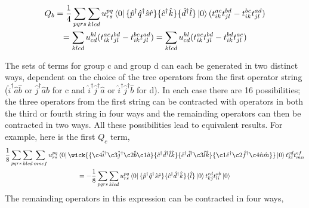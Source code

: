 \begin{equation}
    \begin{gathered}
        Q_b = \frac{1}{4}\sum_{pqrs} \sum_{klcd}
        u^{pq}_{rs} \bra{0}
            \{\hat{p}^\dagger \hat{q}^\dagger \hat{s} \hat{r} \}
            \{\hat{c}^\dagger \hat{k} \}
            \{\hat{d}^\dagger \hat{l} \}
            \ket{0}
            (t^{ac}_{ik}t^{bd}_{jl} - t^{bc}_{ik}t^{ad}_{jl}) \\
        = \sum_{klcd} u^{kl}_{cd}
            (t^{ac}_{ik}t^{bd}_{jl} - t^{bc}_{ik}t^{ad}_{jl})
        = \sum_{klcd} u^{kl}_{cd}
            (t^{ac}_{ik}t^{bd}_{jl} - t^{bd}_{ik}t^{ac}_{jl})
    \end{gathered}
\end{equation}

The sets of terms for group c and group d can each be generated in two distinct
ways, dependent on the choice of the tree operators from the first operator
string ($\hat{i}^\dagger \hat{a} \hat{b}$ or 
$\hat{j}^\dagger \hat{a} \hat{b}$ for c and 
$\hat{i}^\dagger \hat{j}^\dagger \hat{a}$ or 
$\hat{i}^\dagger \hat{j}^\dagger \hat{b}$ for d). In each case there 
are 16 possibilities; the three operators from the first string can be 
contracted with operators in both the third or fourth string in four ways and
the remainding operators can then be contracted in two ways. All these
possibilities lead to equivalent results. For example, here is the first 
$Q_c$ term,
\begin{equation}
    \begin{gathered}
    \frac{1}{8} \sum_{pqrs} \sum_{klcd} \sum_{mnef}
    u^{pq}_{rs} \bra{0}
        \wick{
        \{\c4{\hat{i}}^\dagger \c3{\hat{j}}^\dagger \c2{\hat{b}} \c1{\hat{a}} \}
        \{\hat{c}^\dagger \hat{d}^\dagger \hat{l} \hat{k} \} 
        \{\hat{c}^\dagger \hat{d}^\dagger \c3{\hat{l}} \hat{k} \}
        \{\c1{\hat{e}}^\dagger \c2{\hat{f}}^\dagger \c4{\hat{n}} \hat{m} \}
        }
    \ket{0} t^{cd}_{kl} t^{ef}_{mn} \\
    = - \frac{1}{8} \sum_{pqrs} \sum_{klcd}
    u^{pq}_{rs} \bra{0} 
        \{\hat{p}^\dagger \hat{q}^\dagger \hat{s} \hat{r} \}
        \{\hat{c}^\dagger \hat{d}^\dagger \hat{k} \}
        \{\hat{l} \}
    \ket{0} t^{cd}_{kj} t^{ab}_{li}
    \ket{0}
    \end{gathered}
\end{equation}
The remainding operators in this expression can be contracted in four ways,
